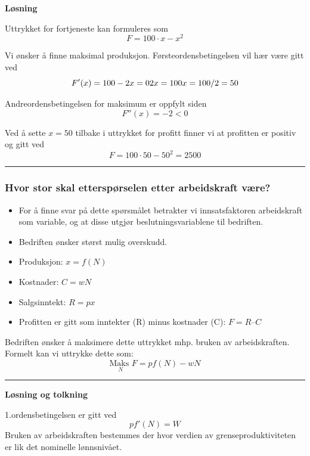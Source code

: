 \documentclass[
  letterpaper,
  DIV=11,
  numbers=noendperiod]{scrartcl}
\providecommand{\tightlist}{%
  \setlength{\itemsep}{0pt}\setlength{\parskip}{0pt}}\usepackage{longtable,booktabs,array}
\begin{document}
\textbf{Løsning}

Uttrykket for fortjeneste kan formuleres som \[
F=100\cdot x - x^2
\]

Vi ønsker å finne maksimal produksjon. Førsteordensbetingelsen vil hær
være gitt ved \begin{equation*}
F'(x)=100-2x=0 \\
2x=100 \\
x=100/2=50
\end{equation*}

Andreordensbetingelsen for maksimum er oppfylt siden \[
F''(x)=-2<0
\]

Ved å sette \(x=50\) tilbake i uttrykket for profitt finner vi at
profitten er positiv og gitt ved \[
F=100\cdot 50 - 50^2=2500
\]

\begin{center}\rule{0.5\linewidth}{0.5pt}\end{center}

\subsubsection{Hvor stor skal etterspørselen etter arbeidskraft
være?}\label{hvor-stor-skal-etterspuxf8rselen-etter-arbeidskraft-vuxe6re}

\begin{itemize}
\tightlist
\item
  For å finne svar på dette spørsmålet betrakter vi innsatsfaktoren
  arbeidskraft som variable, og at disse utgjør beslutningsvariablene
  til bedriften.
\item
  Bedriften ønsker størst mulig overskudd.
\item
  Produksjon: \(x = f(N)\)
\item
  Kostnader: \(C = wN\)
\item
  Salgsinntekt: \(R = px\)
\item
  Profitten er gitt som inntekter (R) minus kostnader (C): \(F = R – C\)
\end{itemize}

Bedriften ønsker å maksimere dette uttrykket mhp. bruken av
arbeidskraften. Formelt kan vi uttrykke dette som: \[
\underset{N}{\text{Maks }} F=pf(N)-wN
\]

\begin{center}\rule{0.5\linewidth}{0.5pt}\end{center}

\textbf{Løsning og tolkning}

1.ordensbetingelsen er gitt ved \[
pf'(N)=W
\] Bruken av arbeidskraften bestemmes der hvor verdien av
grenseproduktiviteten er lik det nominelle lønnsnivået.
\end{document}
